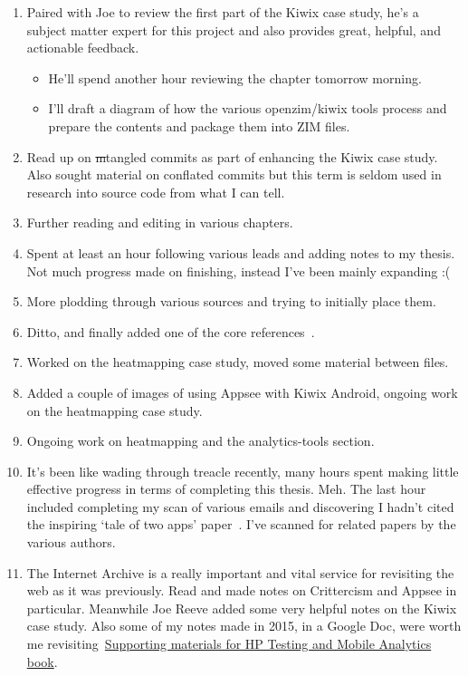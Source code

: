 \begin{enumerate}
    \item Paired with Joe to review the first part of the Kiwix case study, he's a subject matter expert for this project and also provides great, helpful, and actionable feedback.
    \begin{itemize}
        \item He'll spend another hour reviewing the chapter tomorrow morning.
        \item I'll draft a diagram of how the various openzim/kiwix tools process and prepare the contents and package them into ZIM files.
    \end{itemize}
    \item Read up on \sout{m}tangled commits as part of enhancing the Kiwix case study. Also sought material on conflated commits but this term is seldom used in research into source code from what I can tell.
    \item Further reading and editing in various chapters.
    \item Spent at least an hour following various leads and adding notes to my thesis. Not much progress made on finishing, instead I've been mainly expanding :(
    \item More plodding through various sources and trying to initially place them.
    \item Ditto, and finally added one of the core references~\citep{menzies2013_software_analytics_so_what}.
    \item Worked on the heatmapping case study, moved some material between files.
    \item Added a couple of images of using Appsee with Kiwix Android, ongoing work on the heatmapping case study.
    \item Ongoing work on heatmapping and the analytics-tools section.
    \item It's been like wading through treacle recently, many hours spent making little effective progress in terms of completing this thesis. Meh. The last hour included completing my scan of various emails and discovering I hadn't cited the inspiring `tale of two apps' paper~\citep{patro2013_capturing_mobile_experience_in_the_wild}. I've scanned for related papers by the various authors. 
    \item The Internet Archive is a really important and vital service for revisiting the web as it was previously. Read and made notes on Crittercism and Appsee in particular. Meanwhile Joe Reeve added some very helpful notes on the Kiwix case study. Also some of my notes made in 2015, in a Google Doc, were worth me revisiting~\href{https://docs.google.com/document/d/1DT_2kjfx6wMZyte_ZmVeBQMKG2W1q83vWpRe_UmWaHQ/edit#}{Supporting materials for HP Testing and Mobile Analytics book}.

\end{enumerate}
